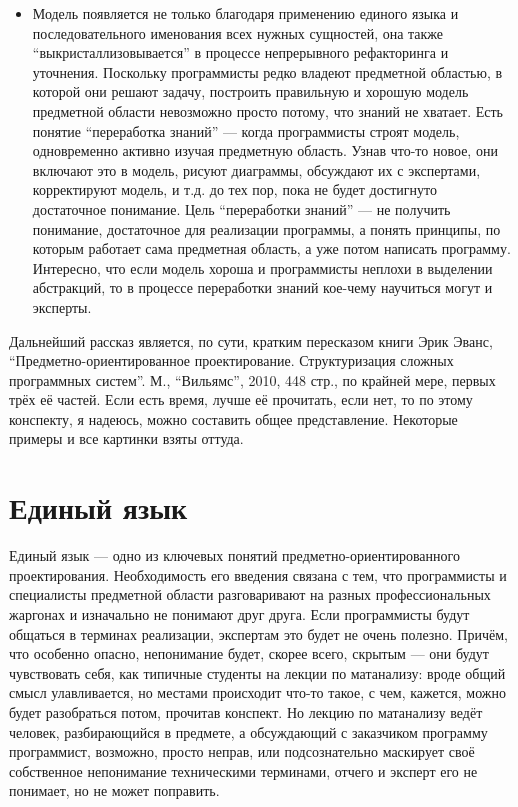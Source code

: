 \documentclass[a5paper]{article}
\begin{document}
\begin{itemize}
    \item Модель появляется не только благодаря применению единого языка и последовательного именования всех нужных сущностей, она также ``выкристаллизовывается'' в процессе непрерывного рефакторинга и уточнения. Поскольку программисты редко владеют предметной областью, в которой они решают задачу, построить правильную и хорошую модель предметной области невозможно просто потому, что знаний не хватает. Есть понятие ``переработка знаний'' --- когда программисты строят модель, одновременно активно изучая предметную область. Узнав что-то новое, они включают это в модель, рисуют диаграммы, обсуждают их с экспертами, корректируют модель, и т.д. до тех пор, пока не будет достигнуто достаточное понимание. Цель ``переработки знаний'' --- не получить понимание, достаточное для реализации программы, а понять принципы, по которым работает сама предметная область, а уже потом написать программу. Интересно, что если модель хороша и программисты неплохи в выделении абстракций, то в процессе переработки знаний кое-чему научиться могут и эксперты.
\end{itemize}

Дальнейший рассказ является, по сути, кратким пересказом книги Эрик Эванс, ``Предметно-ориентированное проектирование. Структуризация сложных программных систем''. М., ``Вильямс'', 2010, 448 стр., по крайней мере, первых трёх её частей. Если есть время, лучше её прочитать, если нет, то по этому конспекту, я надеюсь, можно составить общее представление. Некоторые примеры и все картинки взяты оттуда.

\section{Единый язык}

Единый язык --- одно из ключевых понятий предметно-ориентированного проектирования. Необходимость его введения связана с тем, что программисты и специалисты предметной области разговаривают на разных профессиональных жаргонах и изначально не понимают друг друга. Если программисты будут общаться в терминах реализации, экспертам это будет не очень полезно. Причём, что особенно опасно, непонимание будет, скорее всего, скрытым --- они будут чувствовать себя, как типичные студенты на лекции по матанализу: вроде общий смысл улавливается, но местами происходит что-то такое, с чем, кажется, можно будет разобраться потом, прочитав конспект. Но лекцию по матанализу ведёт человек, разбирающийся в предмете, а обсуждающий с заказчиком программу программист, возможно, просто неправ, или подсознательно маскирует своё собственное непонимание техническими терминами, отчего и эксперт его не понимает, но не может поправить.
\end{document}
